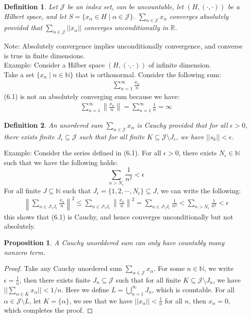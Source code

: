 \documentclass[11pt]{book}
\theoremstyle{break}
\theoremstyle{break}
\newtheorem{prop}[lem]{Proposition}
\newtheorem{defn}{Definition}[corL]
\newcommand{\R}{\mathbb{R}}
\newcommand{\N}{\mathbb{N}}
\newcommand{\note}{\color{red}Note: \color{black}}
\newcommand{\example}{\color{green}Example: \color{black}}
\begin{document}
\begin{defn}
Let $\mathcal{J}$ be an index set, can be uncountable, let $(H,(\cdot, \cdot))$ be a Hilbert space, and let $S = \{ x_{\alpha} \in H \mid \alpha \in \mathcal{J}\}$. $\sum_{\alpha \in \mathcal{J}}x_\alpha$ converges absolutely provided that $\sum_{\alpha \in \mathcal{J}} ||x_\alpha||$ converges unconditionally in $\R$. 
\end{defn}
\note Absolutely convergence implies unconditionally convergence, and converse is true in finite dimensions. \\

\example
Consider a Hilber space $(H,(\cdot,\cdot))$ of infinite dimension. \\
Take a set $\{x_n \mid n \in \N\}$ that is orthonormal. Consider the following sum:
\begin{align}
\sum_{n=1}^\infty \frac{x_n}{n}
\end{align}
(6.1) is not an absolutely converging sum because we have:
\begin{align*}
\sum_{n=1}^\infty \left\|\frac{x_n}{n}\right\| = \sum_{n=1}^\infty \frac{1}{n}  =\infty
\end{align*}

\begin{defn}
An unordered sum $\sum_{\alpha \in \mathcal{J}}x_{\alpha}$ is Cauchy provided that for all $\epsilon>0$, there exists finite $J_{\epsilon}\subseteq \mathcal{J}$ such that for all finite $K \subseteq \mathcal{J}\setminus J_{\epsilon}$, we have $||s_k|| < \epsilon$. 
\end{defn}

\example
Consider the series defined in (6.1). For all $\epsilon>0$, there exists $N_{\epsilon} \in \N$ such that we have the following holds:
$$\sum_{n > N_{\epsilon}}\frac{1}{n^2}< \epsilon$$
For all finite $J \subseteq \N$ such that $J_{\epsilon} = \{ 1, 2, \cdots, N_{\epsilon}\} \subseteq J$, we can write the following:
\begin{align*}
\left\| \sum_{n \in J\setminus J_{\epsilon}}\frac{x_n}{n}\right\|^2 \leq \sum_{n \in J\setminus J_{\epsilon}} \left\|\frac{x_n}{n}\right\|^2 = \sum_{n \in J\setminus J_{\epsilon}}\frac{1}{n^2} < \sum_{n > N_{\epsilon}} \frac{1}{n^2} < \epsilon
\end{align*}
this shows that (6.1) is Cauchy, and hence converges unconditionally but not absolutely. \\

\begin{prop}
A Cauchy unorddered sum can only have countably many nonzero term.
\end{prop}
\begin{proof}
Take any Cauchy unordered sum $\sum_{\alpha \in \mathcal{J}}x_\alpha$. For some $n \in \N$, we write $\epsilon = \frac{1}{n}$, then there exists finite $J_n \subseteq \mathcal{J}$ such that for all finite $K \subseteq \mathcal{J}\setminus J_n$, we have $||\sum_{\alpha \in K}x_\alpha|| < 1/n$. Here we define $L = \bigcup_{n=1}^\infty J_n$, which is countable. For all $\alpha \in \mathcal{J}\setminus L$, let $K = \{\alpha\}$, we see that we have $||x_\alpha|| <\frac{1}{n}$ for all $n $, then $x_\alpha = 0$, which completes the proof. 
\end{proof}
\end{document}
